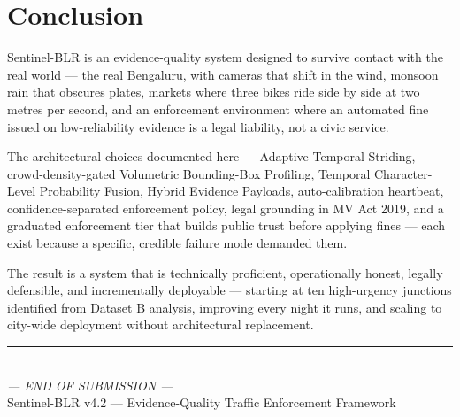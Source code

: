 \documentclass[11pt,a4paper]{article}
\begin{document}
\section{Conclusion}

Sentinel-BLR is an evidence-quality system designed to survive contact with the real world — the real Bengaluru, with cameras that shift in the wind, monsoon rain that obscures plates, markets where three bikes ride side by side at two metres per second, and an enforcement environment where an automated fine issued on low-reliability evidence is a legal liability, not a civic service.

The architectural choices documented here — Adaptive Temporal Striding, crowd-density-gated Volumetric Bounding-Box Profiling, Temporal Character-Level Probability Fusion, Hybrid Evidence Payloads, auto-calibration heartbeat, confidence-separated enforcement policy, legal grounding in MV Act 2019, and a graduated enforcement tier that builds public trust before applying fines — each exist because a specific, credible failure mode demanded them.

The result is a system that is technically proficient, operationally honest, legally defensible, and incrementally deployable — starting at ten high-urgency junctions identified from Dataset B analysis, improving every night it runs, and scaling to city-wide deployment without architectural replacement.

\vspace{2em}
\begin{center}
    \rule{0.5\linewidth}{0.4pt}\\[0.5em]
    {\small\textit{--- END OF SUBMISSION ---}}\\[0.3em]
    {\small Sentinel-BLR v4.2 — Evidence-Quality Traffic Enforcement Framework}
\end{center}
\end{document}
